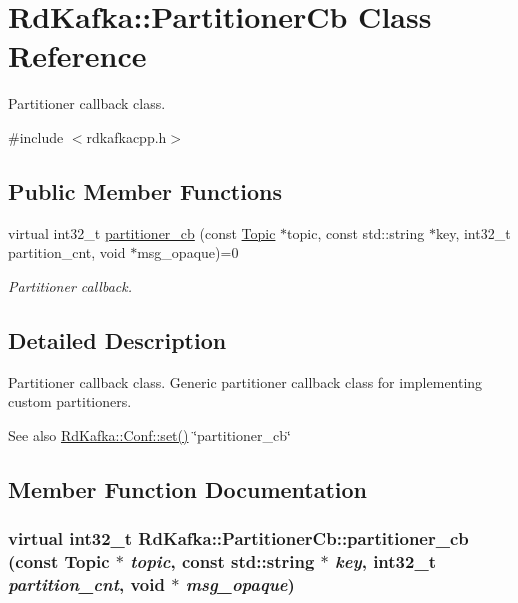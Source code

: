 \hypertarget{classRdKafka_1_1PartitionerCb}{
\section{RdKafka::PartitionerCb Class Reference}
\label{classRdKafka_1_1PartitionerCb}
}


Partitioner callback class.  


{\ttfamily \#include $<$rdkafkacpp.h$>$}\subsection*{Public Member Functions}
\begin{DoxyCompactItemize}
\item 
virtual int32\_\-t \hyperlink{classRdKafka_1_1PartitionerCb_a44c743f829a74fe7bca5a1e931a90f82}{partitioner\_\-cb} (const \hyperlink{classRdKafka_1_1Topic}{Topic} $\ast$topic, const std::string $\ast$key, int32\_\-t partition\_\-cnt, void $\ast$msg\_\-opaque)=0
\begin{DoxyCompactList}\small\item\em Partitioner callback. \item\end{DoxyCompactList}\end{DoxyCompactItemize}


\subsection{Detailed Description}
Partitioner callback class. Generic partitioner callback class for implementing custom partitioners.

\begin{DoxySeeAlso}{See also}
\hyperlink{classRdKafka_1_1Conf_ac122170f07773c5228916a3392929f20}{RdKafka::Conf::set()} {\ttfamily \char`\"{}partitioner\_\-cb\char`\"{}} 
\end{DoxySeeAlso}


\subsection{Member Function Documentation}
\hypertarget{classRdKafka_1_1PartitionerCb_a44c743f829a74fe7bca5a1e931a90f82}{
\subsubsection[{partitioner\_\-cb}]{\setlength{\rightskip}{0pt plus 5cm}virtual int32\_\-t RdKafka::PartitionerCb::partitioner\_\-cb (const {\bf Topic} $\ast$ {\em topic}, \/  const std::string $\ast$ {\em key}, \/  int32\_\-t {\em partition\_\-cnt}, \/  void $\ast$ {\em msg\_\-opaque})}}
\label{classRdKafka_1_1PartitionerCb_a44c743f829a74fe7bca5a1e931a90f82}



